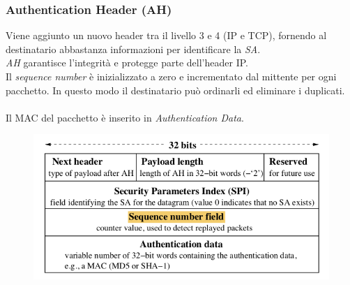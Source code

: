 \documentclass[11pt, a4paper, twoside, italian]{report}
\theoremstyle{plain}
\begin{document}
\subsubsection*{Authentication Header (AH)}
\begin{multicols}{2}
	\noindent
	Viene aggiunto un nuovo header tra il livello 3 e 4 (IP e TCP), fornendo al destinatario abbastanza informazioni per identificare la \textit{SA}.\\
	\textit{AH} garantisce l'integrità e protegge parte dell'header IP.\\
	Il \textit{sequence number} è inizializzato a zero e incrementato dal mittente per ogni pacchetto. In questo modo il destinatario può ordinarli ed eliminare i duplicati.\\
	\\
	Il MAC del pacchetto è inserito in \textit{Authentication Data}.
\columnbreak
	\begin{figure}[H]
		\centering
		\includegraphics[scale=0.75]{ahstructure}
	\end{figure}
\end{multicols}
\end{document}
